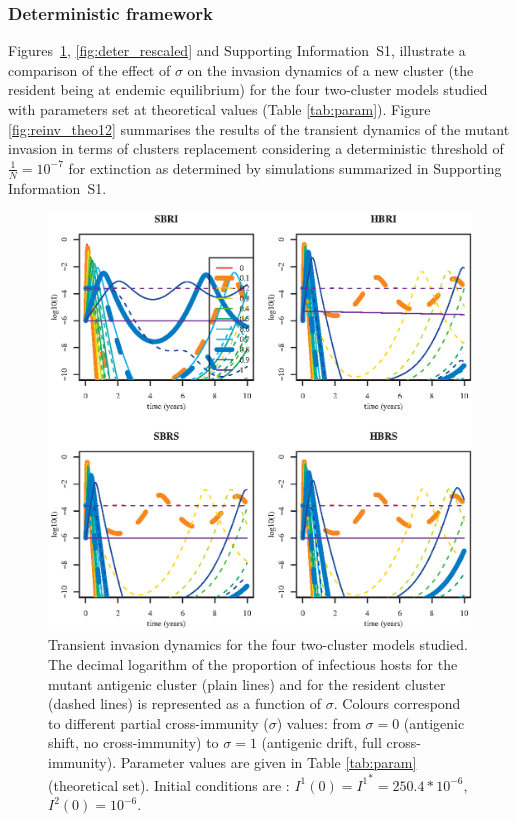 \subsubsection{Deterministic framework}

Figures~\ref{fig:deter}, \ref{fig:deter_rescaled} and Supporting
Information~S1, illustrate a comparison of the effect of $\sigma$ on
the invasion dynamics of a new cluster (the resident being at endemic
equilibrium) for the four two-cluster models studied with parameters
set at theoretical values (Table \ref{tab:param}). Figure
\ref{fig:reinv_theo12} summarises the results of the transient
dynamics of the mutant invasion in terms of clusters replacement
considering a deterministic threshold of $\frac{1}{N}=10^{-7}$ for
extinction as determined by simulations summarized in Supporting
Information~S1.


\begin{figure}[!htbp]
\begin{center}
	\includegraphics[]{graphs/article1/figure_2.eps}
\end{center}
        \caption{ Transient invasion dynamics for the four two-cluster
          models studied. The decimal logarithm of the proportion of
          infectious hosts for the mutant antigenic cluster (plain
          lines) and for the resident cluster (dashed lines) is
          represented as a function of $\sigma$. Colours correspond to
          different partial cross-immunity ($\sigma$) values: from
          $\sigma=0$ (antigenic shift, no cross-immunity) to
          $\sigma=1$ (antigenic drift, full cross-immunity). Parameter
          values are given in Table \ref{tab:param} (theoretical set).
          Initial conditions are : ${I^1}(0) = {I^1}^*=250.4*10^{-6}$,
          ${I^2}(0)=10^{-6}$.}
\label{fig:deter}
\end{figure}




